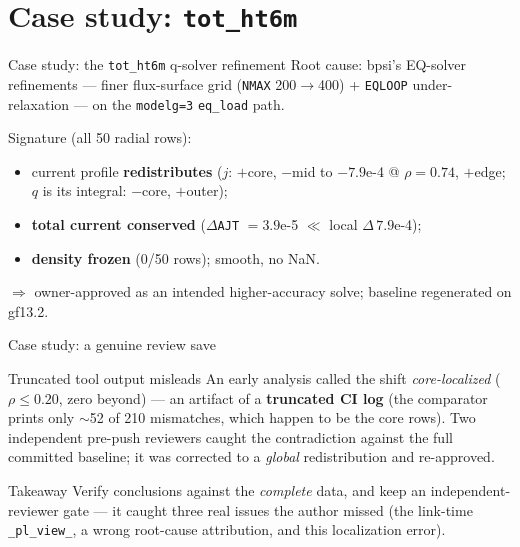 \documentclass[10pt,aspectratio=169]{beamer}
\newcommand{\C}[1]{\texttt{\small #1}}          %
\begin{document}
\section{Case study: \texttt{tot\_ht6m}}
\begin{frame}{Case study: the \texttt{tot\_ht6m} q-solver refinement}
Root cause: bpsi's EQ-solver refinements --- finer flux-surface grid (\C{NMAX} 200$\to$400)
+ \C{EQLOOP} under-relaxation --- on the \C{modelg=3} \C{eq\_load} path.
\medskip

Signature (all 50 radial rows):
\begin{itemize}
\item current profile \textbf{redistributes} ($j$: $+$core, $-$mid to $-7.9$e-4 @ $\rho{=}0.74$,
      $+$edge; $q$ is its integral: $-$core, $+$outer);
\item \textbf{total current conserved} ($\Delta$\C{AJT} $=3.9$e-5 $\ll$ local $\Delta\,7.9$e-4);
\item \textbf{density frozen} (0/50 rows); smooth, no NaN.
\end{itemize}
\medskip
$\Rightarrow$ owner-approved as an intended higher-accuracy solve; baseline regenerated on gf13.2.
\end{frame}

\begin{frame}{Case study: a genuine review save}
\begin{alertblock}{Truncated tool output misleads}
An early analysis called the shift \emph{core-localized} ($\rho\le0.20$, zero beyond) --- an artifact
of a \textbf{truncated CI log} (the comparator prints only $\sim$52 of 210 mismatches, which happen to
be the core rows). Two independent pre-push reviewers caught the contradiction against the full
committed baseline; it was corrected to a \emph{global} redistribution and re-approved.
\end{alertblock}
\begin{block}{Takeaway}
Verify conclusions against the \emph{complete} data, and keep an independent-reviewer gate ---
it caught three real issues the author missed (the link-time \C{\_pl\_view\_}, a wrong root-cause
attribution, and this localization error).
\end{block}
\end{frame}

\end{document}
